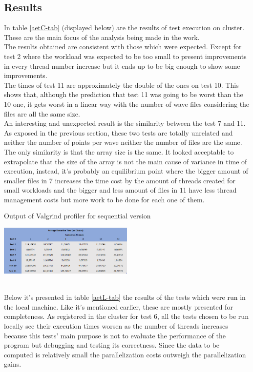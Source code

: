 \documentclass[10pt,journal,compsoc]{IEEEtran}
\begin{document}
\subsection{Results}
In table \ref{aetC-tab} (displayed below) are the results of test execution on cluster. These are the main focus of the analysis being made in the work. 
\\
The results obtained are consistent with those which were expected.  Except for test 2 where the workload was expected to be too small to present improvements in every thread number increase but it ends up to be big enough to show some improvements.
\\
The times of test 11 are approximately the double of the ones on test 10. This shows that, although the prediction that test 11 was going to be worst than the 10 one, it gets worst in a linear way with the number of wave files considering the files are all the same size.
\\
An interesting and unexpected result is the similarity between the test 7 and 11. As exposed in the previous section, these two tests are totally unrelated and neither the number of points per wave neither the number of files are the same. The only similarity is that the array size is the same. It looked acceptable to extrapolate that the size of the array is not the main cause of variance in time of execution, instead, it's probably an equilibrium point where the bigger amount of smaller files in 7 increases the time cost by the amount of threads created for small workloads and the bigger and less amount of files in 11 have less thread management costs but more work to be done for each one of them.
\\
\begin{table}[h]
\centering
\caption{Output of Valgrind profiler for sequential version}
\includegraphics[width=0.5\textwidth]{../DRAFT/PerformanceAnalysis - Prints/Average Execution Time (cluster) - Table.PNG} 
\label{aetC-tab}
\end{table}
\\
Below it's presented in table \ref{aetL-tab} the results of the tests which were run in the local machine. Like it's mentioned earlier, these are mostly presented for completeness. As registered in the cluster for test 6, all the tests chosen to be run locally see their execution times worsen as the number of threads increases because this tests’ main purpose is not to evaluate the performance of the program but debugging and testing its correctness. Since the data to be computed is relatively small the parallelization costs outweigh the parallelization gains. 
\end{document}
